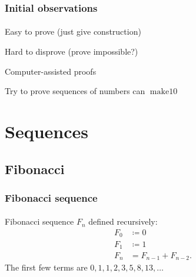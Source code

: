 \documentclass{beamer}                             %
\newcommand*{\defeq}{\coloneqq}
\DeclareMathOperator{\maketen}{make10}
\newenvironment{wideitemize}
  {\itemize\setlength{\itemsep}{0.5cm}}
  {\enditemize}
\begin{document}
\begin{frame}
\frametitle{Initial observations}
\framesubtitle{}

\begin{wideitemize}
  \item Easy to prove (just give construction)
  \item Hard to disprove (prove impossible?)
  \item Computer-assisted proofs
  \item Try to prove sequences of numbers can \( \maketen \)
  \end{wideitemize}
\end{frame}

\section{Sequences}

\subsection{Fibonacci}

\begin{frame}
\frametitle{Fibonacci sequence}
\framesubtitle{}

\begin{definition}
  Fibonacci sequence \( F_n \) defined recursively:
  \begin{align*}
    F_0 &\defeq 0 \\
    F_1 &\defeq 1 \\
    F_n &= F_{n - 1} + F_{n - 2}.
  \end{align*}
  The first few terms are \( 0, 1, 1, 2, 3, 5, 8, 13, \dotsc \)
\end{definition}
\end{frame}
\end{document}
